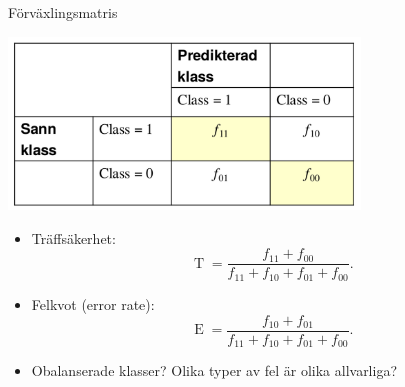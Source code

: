 \documentclass[10pt,english]{beamer}
\begin{document}
\begin{frame}{Förväxlingsmatris}
\begin{center}
    \includegraphics[width=0.7\textwidth]{figs/Screenshot at 2020-08-18 12-24-31.png}
\end{center}

\begin{itemize}
    \item Träffsäkerhet:
    \begin{equation*}
        \operatorname{T} = \frac{f_{11} + f_{00}}{f_{11} + f_{10} + f_{01} + f_{00}}.
    \end{equation*}
    \item Felkvot (error rate):
    \begin{equation*}
        \operatorname{E} = \frac{f_{10} + f_{01}}{f_{11} + f_{10} + f_{01} + f_{00}}.
    \end{equation*}
    \item Obalanserade klasser? Olika typer av fel är olika allvarliga?
\end{itemize}
    
\end{frame}
\end{document}

